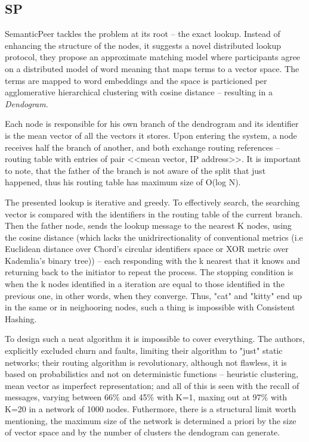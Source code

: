 \subsection{SP}
\label{sec:SP}
SemanticPeer tackles the problem at its root – the exact lookup. Instead of enhancing the structure of the nodes, it suggests a novel distributed lookup protocol, they propose an approximate matching model where participants agree on a distributed model of word meaning that maps terms to a vector space. The terms are mapped to word embeddings and the space is particioned per agglomerative hierarchical clustering with cosine distance – resulting in a \textit{Dendogram}.

Each node is responsible for his own branch of the dendrogram and its identifier is the mean vector of all the vectors it stores. Upon entering the system, a node receives half the branch of another, and both exchange routing references – routing table with entries of pair <<mean vector, IP address>>. It is important to note, that the father of the branch is not aware of the split that just happened, thus his routing table has maximum size of O(log N).

The presented lookup is iterative and greedy. To effectively search, the searching vector is compared with the identifiers in the routing table of the current branch. Then the father node, sends the lookup message to the nearest K nodes, using the cosine distance (which lacks the unidrirectionality of conventional metrics (i.e Euclidean distance over Chord's circular identifiers space or XOR metric over Kademlia's binary tree)) – each responding with the k nearest that it knows and returning back to the initiator to repeat the process. The stopping condition is when the k nodes identified in a iteration are equal to those identified in the previous one, in other words, when they converge. Thus, "cat" and "kitty" end up in the same or in neighooring nodes, such a thing is impossible with Consistent Hashing.

To design such a neat algorithm it is impossible to cover everything. The authors, explicitly excluded churn and faults, limiting their algorithm to "just" static networks; their routing algorithm is revolutionary, although not flawless, it is based on probabilistics and not on deterministic functions – heuristic clustering, mean vector as imperfect representation; and all of this is seen with the recall of messages, varying between 66\% and 45\% with K=1, maxing out at 97\% with K=20 in a network of 1000 nodes. Futhermore, there is a structural limit worth mentioning, the maximum size of the network is determined a priori by the size of vector space and by the number of clusters the dendogram can generate.

